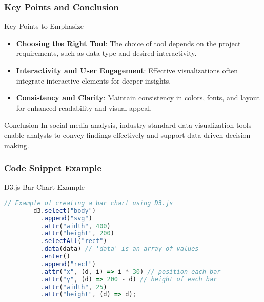 \documentclass{beamer}
\begin{document}
\begin{frame}[fragile]
    \frametitle{Key Points and Conclusion}
    \begin{block}{Key Points to Emphasize}
        \begin{itemize}
            \item \textbf{Choosing the Right Tool}: The choice of tool depends on the project requirements, such as data type and desired interactivity.
            \item \textbf{Interactivity and User Engagement}: Effective visualizations often integrate interactive elements for deeper insights.
            \item \textbf{Consistency and Clarity}: Maintain consistency in colors, fonts, and layout for enhanced readability and visual appeal.
        \end{itemize}
    \end{block}
    
    \begin{block}{Conclusion}
        In social media analysis, industry-standard data visualization tools enable analysts to convey findings effectively and support data-driven decision making. 
    \end{block}
\end{frame}

\begin{frame}[fragile]
    \frametitle{Code Snippet Example}
    \begin{block}{D3.js Bar Chart Example}
        \begin{lstlisting}[language=JavaScript]
        // Example of creating a bar chart using D3.js
        d3.select("body")
          .append("svg")
          .attr("width", 400)
          .attr("height", 200)
          .selectAll("rect")
          .data(data) // 'data' is an array of values
          .enter()
          .append("rect")
          .attr("x", (d, i) => i * 30) // position each bar
          .attr("y", (d) => 200 - d) // height of each bar
          .attr("width", 25)
          .attr("height", (d) => d);
        \end{lstlisting}
    \end{block}
\end{frame}
\end{document}
